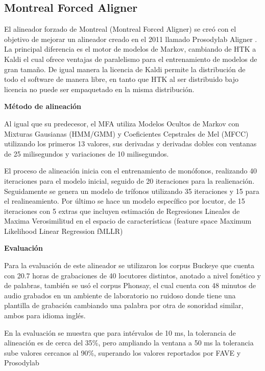 \subsection{Montreal Forced Aligner}



El alineador forzado de Montreal (Montreal Forced Aligner) se creó con el objetivo de mejorar un alineador creado en el 2011 llamado Prosodylab Aligner \cite{Gorman2011Prosodylab-aligner:Speech}. La principal diferencia es el motor de modelos de Markov, cambiando de HTK a Kaldi el cual ofrece ventajas de paralelismo para el entrenamiento de modelos de gran tamaño. De igual manera la licencia de Kaldi permite la distribución de todo el software de manera libre, en tanto que HTK al ser distribuido bajo licencia no puede ser empaquetado en la misma distribución.

\textbf{Método de alineación}

Al igual que su predecesor, el MFA utiliza Modelos Ocultos de Markov con Mixturas Gausianas (HMM/GMM) y Coeficientes Cepstrales de Mel (MFCC) utilizando los primeros 13 valores, sus derivadas y derivadas dobles con ventanas de 25 milisegundos y variaciones de 10 milisegundos.


El proceso de alineación inicia con el entrenamiento de monófonos, realizando 40 iteraciones para el modelo inicial, seguido de 20 iteraciones para la realienación. Seguidamente se genera un modelo de trífonos utilizando 35 iteraciones y 15 para el realineamiento. Por último se hace un modelo específico por locutor, de 15 iteraciones con 5 extras que incluyen estimación de Regresiones Lineales de Maxima Verosimilitud en el espacio de características (feature space Maximum Likelihood Linear Regression fMLLR)   

\textbf{Evaluación}

Para la evaluación de este alineador se utilizaron los corpus Buckeye \cite{PittTheReliability} que cuenta con 20.7 horas de grabaciones de 40 locutores distintos, anotado a nivel fonético y de palabras, también se usó el corpus Phonsay, el cual cuenta con 48 minutos de audio grabados en un ambiente de laboratorio no ruidoso donde tiene una plantilla de grabación cambiando una palabra por otra de sonoridad similar, ambos para idioma inglés.

En la evaluación se muestra que para intérvalos de 10 ms, la tolerancia de alineación es de cerca del 35\%, pero ampliando la ventana a 50 ms la tolerancia sube valores cercanos al 90\%, superando los valores reportados por FAVE\cite{Rosenfelder2014FAVE:Suite} y Prosodylab \cite{Gorman2011Prosodylab-aligner:Speech}



